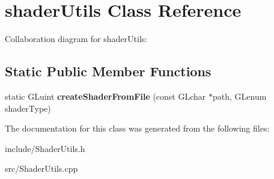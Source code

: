 \hypertarget{classshader_utils}{\section{shader\-Utils Class Reference}
\label{classshader_utils}
}


Collaboration diagram for shader\-Utils\-:
\subsection*{Static Public Member Functions}
\begin{DoxyCompactItemize}
\item 
\hypertarget{classshader_utils_a3965740e88364f65e4af4e751cf973b4}{static G\-Luint {\bfseries create\-Shader\-From\-File} (const G\-Lchar $\ast$path, G\-Lenum shader\-Type)}\label{classshader_utils_a3965740e88364f65e4af4e751cf973b4}

\end{DoxyCompactItemize}


The documentation for this class was generated from the following files\-:\begin{DoxyCompactItemize}
\item 
include/Shader\-Utils.\-h\item 
src/Shader\-Utils.\-cpp\end{DoxyCompactItemize}
